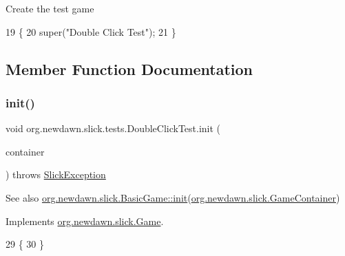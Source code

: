 Create the test game 
\begin{DoxyCode}
19                              \{
20         super(\textcolor{stringliteral}{"Double Click Test"});
21     \}
\end{DoxyCode}


\subsection{Member Function Documentation}
\mbox{\label{classorg_1_1newdawn_1_1slick_1_1tests_1_1_double_click_test_af05802df0ef6f5949a4c0d67c26947f0}} 
\subsubsection{\texorpdfstring{init()}{init()}}
{\footnotesize\ttfamily void org.\+newdawn.\+slick.\+tests.\+Double\+Click\+Test.\+init (\begin{DoxyParamCaption}\item[{\mbox{\hyperlink{classorg_1_1newdawn_1_1slick_1_1_game_container}{Game\+Container}}}]{container }\end{DoxyParamCaption}) throws \mbox{\hyperlink{classorg_1_1newdawn_1_1slick_1_1_slick_exception}{Slick\+Exception}}\hspace{0.3cm}{\ttfamily [inline]}}

\begin{DoxySeeAlso}{See also}
\mbox{\hyperlink{classorg_1_1newdawn_1_1slick_1_1_basic_game_a8af0900217e4d389249f71367b22d114}{org.\+newdawn.\+slick.\+Basic\+Game\+::init}}(\mbox{\hyperlink{classorg_1_1newdawn_1_1slick_1_1_game_container}{org.\+newdawn.\+slick.\+Game\+Container}}) 
\end{DoxySeeAlso}


Implements \mbox{\hyperlink{interfaceorg_1_1newdawn_1_1slick_1_1_game_ad2dd6affab08bb8fdb5fab0815957b7a}{org.\+newdawn.\+slick.\+Game}}.


\begin{DoxyCode}
29                                                                     \{
30     \}
\end{DoxyCode}
\mbox{\label{classorg_1_1newdawn_1_1slick_1_1tests_1_1_double_click_test_a5f6032221b0341b620824798669ae7ea}} 
